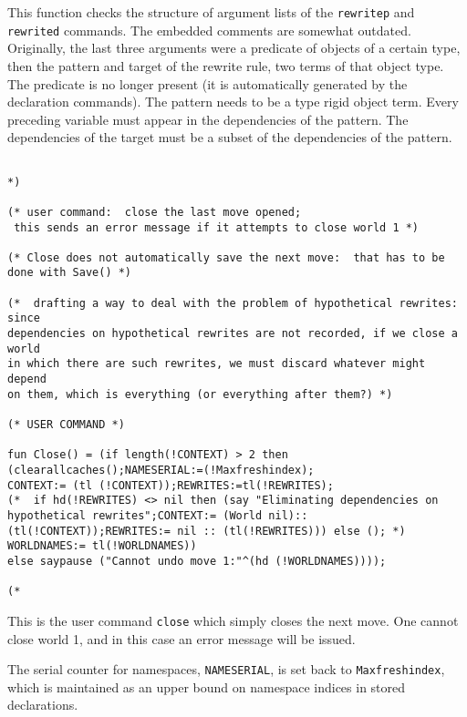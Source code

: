 \documentclass{article}
\begin{document}
This function checks the structure of argument lists of the {\tt rewritep} and {\tt rewrited} commands.  The embedded comments are somewhat outdated.
Originally, the last three arguments were a predicate of objects of a certain type, then the pattern and target of the rewrite rule, two terms of that object type.
The predicate is no longer present (it is automatically generated by the declaration commands).  The pattern needs to be a type rigid object term.  Every preceding
variable must appear in the dependencies of the pattern.  The dependencies of the target must be a subset of the dependencies of the pattern.

\begin{verbatim}

*)

(* user command:  close the last move opened; 
 this sends an error message if it attempts to close world 1 *)

(* Close does not automatically save the next move:  that has to be done with Save() *)

(*  drafting a way to deal with the problem of hypothetical rewrites:  since
dependencies on hypothetical rewrites are not recorded, if we close a world
in which there are such rewrites, we must discard whatever might depend
on them, which is everything (or everything after them?) *)

(* USER COMMAND *)

fun Close() = (if length(!CONTEXT) > 2 then
(clearallcaches();NAMESERIAL:=(!Maxfreshindex);
CONTEXT:= (tl (!CONTEXT));REWRITES:=tl(!REWRITES);
(*  if hd(!REWRITES) <> nil then (say "Eliminating dependencies on hypothetical rewrites";CONTEXT:= (World nil)::(tl(!CONTEXT));REWRITES:= nil :: (tl(!REWRITES))) else (); *)
WORLDNAMES:= tl(!WORLDNAMES))  
else saypause ("Cannot undo move 1:"^(hd (!WORLDNAMES))));

(*

\end{verbatim}

This is the user command {\tt close} which simply closes the next  move.  One cannot close world 1, and in this case an error message will be issued.

The serial counter for namespaces, {\tt NAMESERIAL}, is set back to {\tt Maxfreshindex}, which is maintained as an upper bound on namespace indices in stored declarations.
\end{document}
